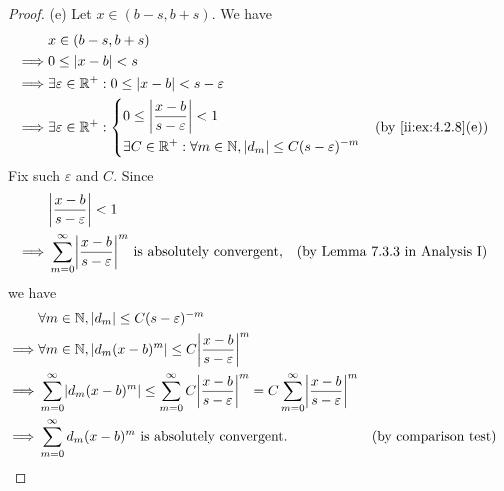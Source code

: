 \begin{proof}{(e)}
  Let \(x \in (b - s, b + s)\).
  We have
  \begin{align*}
             & x \in (b - s, b + s)                                                                                         \\
    \implies & 0 \leq \abs{x - b} < s                                                                                       \\
    \implies & \exists \varepsilon \in \R^+ : 0 \leq \abs{x - b} < s - \varepsilon                                          \\
    \implies & \exists \varepsilon \in \R^+ : \begin{dcases}
                                                0 \leq \abs{\dfrac{x - b}{s - \varepsilon}} < 1 \\
                                                \exists C \in \R^+ : \forall m \in \N, \abs{d_m} \leq C (s - \varepsilon)^{-m}
                                              \end{dcases} &  & \by{ii:ex:4.2.8}[e]
  \end{align*}
  Fix such \(\varepsilon\) and \(C\).
  Since
  \begin{align*}
             & \abs{\dfrac{x - b}{s - \varepsilon}} < 1                                                                                                \\
    \implies & \sum_{m = 0}^\infty \abs{\dfrac{x - b}{s - \varepsilon}}^m \text{ is absolutely convergent}, &  & \text{(by Lemma 7.3.3 in Analysis I)}
  \end{align*}
  we have
  \begin{align*}
             & \forall m \in \N, \abs{d_m} \leq C (s - \varepsilon)^{-m}                                                                                                                                                     \\
    \implies & \forall m \in \N, \abs{d_m (x - b)^m} \leq C \abs{\dfrac{x - b}{s - \varepsilon}}^{m}                                                                                                                         \\
    \implies & \sum_{m = 0}^\infty \abs{d_m (x - b)^m} \leq \sum_{m = 0}^\infty C \abs{\dfrac{x - b}{s - \varepsilon}}^{m} = C \sum_{m = 0}^\infty \abs{\dfrac{x - b}{s - \varepsilon}}^{m}                                  \\
    \implies & \sum_{m = 0}^\infty d_m (x - b)^m \text{ is absolutely convergent}.                                                                                                          &  & \text{(by comparison test)}

\end{align*}
\end{proof}
